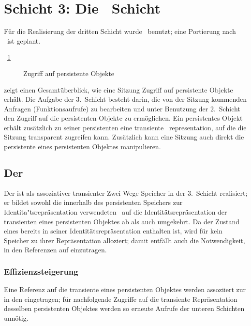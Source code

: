\section{Schicht 3: Die \plob\ Schicht}
%
F\"{u}r die Realisierung der dritten Schicht wurde \lwcl\ benutzt; eine
Portierung nach \allegrocl\ ist geplant.
%
\par{}\figurename~\ref{fig:pldflow} %
%
\begin{figure}[htbp]%
\ifbuch%
\centerline{}%
\else%
\centerline{}%
\fi%
\caption{Zugriff auf persistente Objekte}%
\label{fig:pldflow}%
\end{figure}%
%
zeigt einen Gesamt\"{u}berblick, wie eine Sitzung Zugriff auf persistente
Objekte erh\"{a}lt. Die Aufgabe der 3.~Schicht besteht darin, die von der
Sitzung kommenden Anfragen (Funktionsaufrufe) zu bearbeiten und unter
Benutzung der 2.~Schicht den Zugriff auf die persistenten Objekte zu
erm\"{o}glichen. Ein persistentes Objekt erh\"{a}lt zu\-s\"{a}tz\-lich zu
seiner persistenten eine transiente \clos\ representation, auf die
die Sitzung transparent zugreifen kann. Zus\"{a}tzlich kann eine Sitzung
auch direkt die persistente \representation{} eines persistenten
Objektes manipulieren.
%
\subsection{Der \protect\cache}
%
Der \cache\/ ist als assoziativer transienter Zwei-Wege-Speicher in der
3.~Schicht realisiert; er bildet sowohl die innerhalb des persistenten
Speichers zur Identita"tsrepr\"{a}sentation verwendeten \objid[s]\ auf
die Identit\"{a}tsrepr\"{a}sentation der transienten \representation{} eines
persistenten Objektes ab als auch umgekehrt. Da der Zustand eines
\immval[s]\/ bereits in seiner Identit\"{a}tsrepr\"{a}sentation enthalten
ist, wird f\"{u}r \immval[s]\/ kein Speicher zu ihrer Repr\"{a}sentation
alloziert; damit entf\"{a}llt auch die Notwendigkeit, in den
\cache\/ Referenzen auf \immval[s]\/ einzutragen.
%
\subsubsection{Effizienzsteigerung}
%
Eine Referenz auf die transiente \representation{} eines persistenten
Objektes werden assoziiert zur \sobjid\/ in den \cache\/ eingetragen;
f\"{u}r nachfolgende Zugriffe auf die transiente Re\-pr\"{a}\-sen\-ta\-tion
desselben persistenten Objektes werden so erneute Aufrufe der unteren
Schichten unn\"{o}tig.
%
